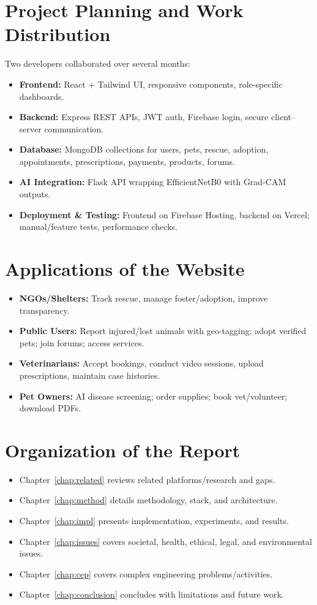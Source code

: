 \documentclass[12pt,a4paper]{report}
\numberwithin{figure}{chapter}
\numberwithin{table}{chapter}
\begin{document}
\section{Project Planning and Work Distribution}
Two developers collaborated over several months:
\begin{itemize}
  \item \textbf{Frontend:} React + Tailwind UI, responsive components, role-specific dashboards.
  \item \textbf{Backend:} Express REST APIs, JWT auth, Firebase login, secure client--server communication.
  \item \textbf{Database:} MongoDB collections for users, pets, rescue, adoption, appointments, prescriptions, payments, products, forums.
  \item \textbf{AI Integration:} Flask API wrapping EfficientNetB0 with Grad-CAM outputs.
  \item \textbf{Deployment \& Testing:} Frontend on Firebase Hosting, backend on Vercel; manual/feature tests, performance checks.
\end{itemize}

\section{Applications of the Website}
\begin{itemize}
  \item \textbf{NGOs/Shelters:} Track rescue, manage foster/adoption, improve transparency.
  \item \textbf{Public Users:} Report injured/lost animals with geo-tagging; adopt verified pets; join forums; access services.
  \item \textbf{Veterinarians:} Accept bookings, conduct video sessions, upload prescriptions, maintain case histories.
  \item \textbf{Pet Owners:} AI disease screening; order supplies; book vet/volunteer; download PDFs.
\end{itemize}

\section{Organization of the Report}
\begin{itemize}
  \item Chapter~\ref{chap:related} reviews related platforms/research and gaps.
  \item Chapter~\ref{chap:method} details methodology, stack, and architecture.
  \item Chapter~\ref{chap:impl} presents implementation, experiments, and results.
  \item Chapter~\ref{chap:issues} covers societal, health, ethical, legal, and environmental issues.
  \item Chapter~\ref{chap:cep} covers complex engineering problems/activities.
  \item Chapter~\ref{chap:conclusion} concludes with limitations and future work.
\end{itemize}
\end{document}
